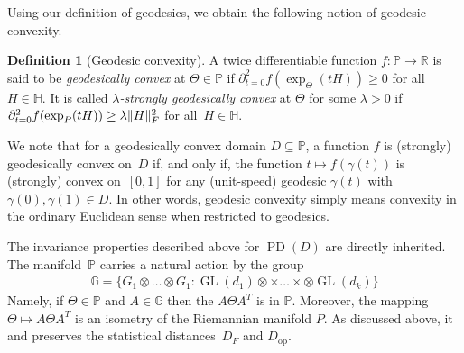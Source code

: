 \documentclass[aos]{imsart}
\theoremstyle{definition}
\newtheorem*{definition}{Definition}
\numberwithin{equation}{section}
\DeclareMathOperator{\op}{op}
\DeclareMathOperator{\GL}{GL}
\DeclareMathOperator{\PD}{PD}
\DeclarePairedDelimiter{\norm}{\lVert}{\rVert}
\newcommand{\R}{{\mathbb{R}}}
\renewcommand{\P}{{\mathbb{P}}}
\renewcommand{\H}{{\mathbb{H}}}
\newcommand{\G}{{\mathbb{G}}}
\newcommand{\ot}{\otimes}
\newcommand{\samp}{x}
\newcommand{\MW}[1]{{\color{red}[MW: #1]}}
\begin{document}
Using our definition of geodesics, we obtain the following notion of geodesic convexity.

\begin{definition}[Geodesic convexity]
A twice differentiable function $f\colon \P \to \R$ is said to be \emph{geodesically convex} at $\Theta\in\P$ if $\partial^2_{t=0} f(\exp_\Theta(tH)) \geq 0$ for all~$H\in\H$.
It is called \emph{$\lambda$-strongly geodesically convex} at $\Theta$ for some $\lambda>0$ if $\partial^2_{t=0} f(\exp_P(tH)) \geq \lambda \norm H_F^2$ for all~$H\in\H$.

We note that for a geodesically convex domain $D \subseteq \P$, a function $f$ is (strongly) geodesically convex on~$D$ if, and only if, the function $t \mapsto f(\gamma(t))$ is (strongly) convex on~$[0,1]$ for any (unit-speed) geodesic $\gamma(t)$ with $\gamma(0),\gamma(1)\in D$.
In other words, geodesic convexity simply means convexity in the ordinary Euclidean sense when restricted to geodesics.

\end{definition}

The invariance properties described above for $\PD(D)$ are directly inherited.
The manifold~$\P$ carries a natural action by the group
\begin{align*}
  \G =  \{G_1 \ot \dots \ot G_1: \GL(d_1)\ot \times \dots \times \ot \GL(d_k)\}
\end{align*}
Namely, if $\Theta \in \P$ and $A \in \G$ then the $A \Theta A^T$ is in $\P$. Moreover, the mapping $\Theta \mapsto A\Theta A^T$ is an isometry of the Riemannian manifold $P$. As discussed above, it and preserves the statistical distances~$D_F$ and $D_{\op}$.

\end{document}
